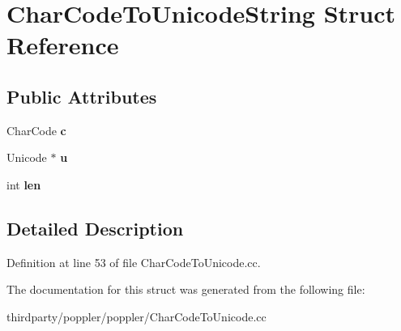 \hypertarget{struct_char_code_to_unicode_string}{}\section{Char\+Code\+To\+Unicode\+String Struct Reference}
\label{struct_char_code_to_unicode_string}
\subsection*{Public Attributes}
\begin{DoxyCompactItemize}
\item 
\mbox{\label{struct_char_code_to_unicode_string_afc5737bf8a1e62627be795b688cdc1b4}} 
Char\+Code {\bfseries c}
\item 
\mbox{\label{struct_char_code_to_unicode_string_a8c1a54e35bfbb544642bde3c7ebbaa8d}} 
Unicode $\ast$ {\bfseries u}
\item 
\mbox{\label{struct_char_code_to_unicode_string_ab2d665023ca7a80e60833673420cf3cf}} 
int {\bfseries len}
\end{DoxyCompactItemize}


\subsection{Detailed Description}


Definition at line 53 of file Char\+Code\+To\+Unicode.\+cc.



The documentation for this struct was generated from the following file\+:\begin{DoxyCompactItemize}
\item 
thirdparty/poppler/poppler/Char\+Code\+To\+Unicode.\+cc\end{DoxyCompactItemize}
